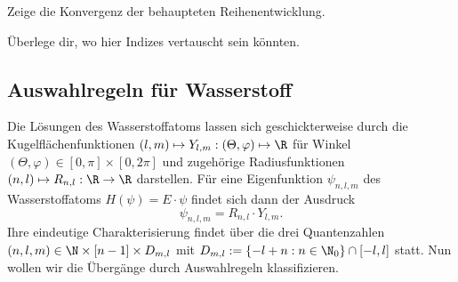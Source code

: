 \documentclass{subfile}
\begin{document}
        \begin{Aufgabe}
            \nr{} Zeige die Konvergenz der behaupteten Reihenentwicklung. 

            \nr{} Überlege dir, wo hier Indizes vertauscht sein könnten. 
        \end{Aufgabe}

    \subsection{Auswahlregeln für Wasserstoff}
        Die Lösungen des Wasserstoffatoms lassen sich geschickterweise durch die Kugelflächenfunktionen $(l,m)\mapsto Y_{l,m}:(\Theta,\varphi)\mapsto\R$ für Winkel $(\Theta,\varphi)\in[0,\pi]\times[0,2\pi]$ und zugehörige Radiusfunktionen $(n,l)\mapsto R_{n,l}:\R\to\R$ darstellen. Für eine Eigenfunktion $\psi_{n,l,m}$ des Wasserstoffatoms $H(\psi) = E\cdot\psi$ findet sich dann der Ausdruck
        \[
            \psi_{n,l,m} = R_{n,l}\cdot Y_{l,m}.
        \]
        Ihre eindeutige Charakterisierung findet über die drei Quantenzahlen $(n,l,m)\in\N\times [n-1]\times D_{m,l}$ mit $D_{m,l}:=\{-l + n:n\in\N_0\}\cap[-l,l]$ statt. Nun wollen wir die Übergänge durch Auswahlregeln klassifizieren.
\end{document}

